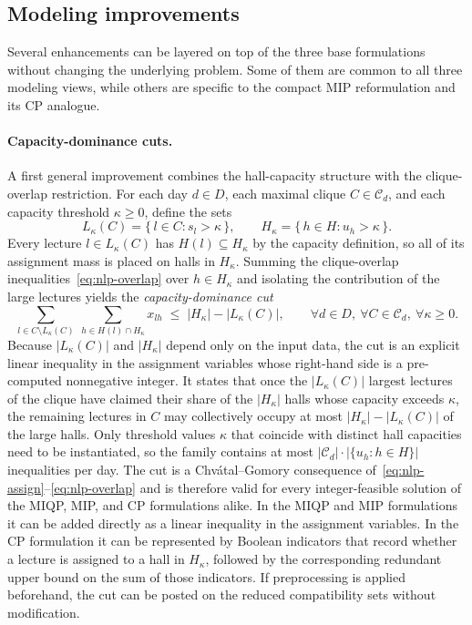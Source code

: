 \documentclass[11pt]{article}
\begin{document}
\subsection{Modeling improvements}  \label{subsec:Modeling-improvements}
Several enhancements can be layered on top of the three base formulations without changing the underlying problem. Some of them are common to all three modeling views, while others are specific to the compact MIP reformulation and its CP analogue.

\paragraph{Capacity-dominance cuts.}
A first general improvement combines the hall-capacity structure with the clique-overlap restriction. For each day $d \in D$, each maximal clique $C \in \mathcal{C}_d$, and each capacity threshold $\kappa \ge 0$, define the sets
\[
L_\kappa(C)=\{\,l \in C : s_l > \kappa\,\}, \qquad
H_\kappa=\{\,h \in H : u_h > \kappa\,\}.
\]
Every lecture $l \in L_\kappa(C)$ has $H(l) \subseteq H_\kappa$ by the capacity definition, so all of its assignment mass is placed on halls in $H_\kappa$. Summing the clique-overlap inequalities~\eqref{eq:nlp-overlap} over $h \in H_\kappa$ and isolating the contribution of the large lectures yields the \emph{capacity-dominance cut}
\begin{equation}
    \sum_{l \in C \setminus L_\kappa(C)}\ \sum_{h \in H(l) \cap H_\kappa} x_{lh}
    \;\le\; |H_\kappa| - |L_\kappa(C)|,
    \qquad \forall d \in D,\ \forall C \in \mathcal{C}_d,\ \forall \kappa \ge 0.
    \label{eq:capacity-dominance}
\end{equation}
Because $|L_\kappa(C)|$ and $|H_\kappa|$ depend only on the input data, the cut is an explicit linear inequality in the assignment variables whose right-hand side is a pre-computed nonnegative integer. It states that once the $|L_\kappa(C)|$ largest lectures of the clique have claimed their share of the $|H_\kappa|$ halls whose capacity exceeds $\kappa$, the remaining lectures in $C$ may collectively occupy at most $|H_\kappa|-|L_\kappa(C)|$ of the large halls. Only threshold values $\kappa$ that coincide with distinct hall capacities need to be instantiated, so the family contains at most $|\mathcal{C}_d| \cdot |\{u_h : h \in H\}|$ inequalities per day. The cut is a Chv\'atal--Gomory consequence of~\eqref{eq:nlp-assign}--\eqref{eq:nlp-overlap} and is therefore valid for every integer-feasible solution of the MIQP, MIP, and CP formulations alike. In the MIQP and MIP formulations it can be added directly as a linear inequality in the assignment variables. In the CP formulation it can be represented by Boolean indicators that record whether a lecture is assigned to a hall in $H_\kappa$, followed by the corresponding redundant upper bound on the sum of those indicators. If preprocessing is applied beforehand, the cut can be posted on the reduced compatibility sets without modification.
\end{document}
